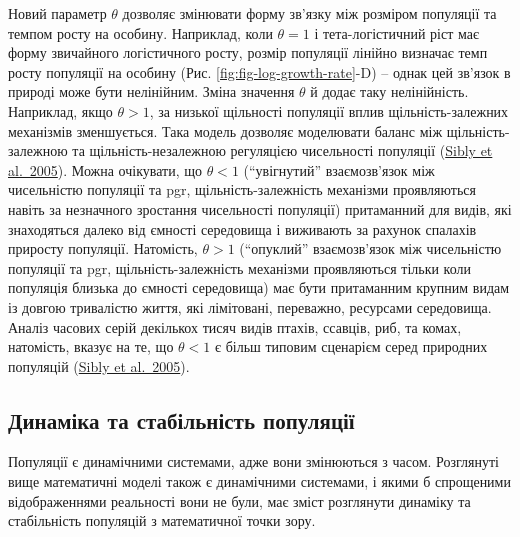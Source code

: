 \documentclass[
  11pt,
]{book}
\begin{document}
Новий параметр \(\theta\) дозволяє змінювати форму зв'язку між розміром популяції та темпом росту на особину. Наприклад, коли \(\theta = 1\) і тета-логістичний ріст має форму звичайного логістичного росту, розмір популяції лінійно визначає темп росту популяції на особину (Рис. \ref{fig:fig-log-growth-rate}-D) -- однак цей зв'язок в природі може бути нелінійним. Зміна значення \(\theta\) й додає таку нелінійність. Наприклад, якщо \(\theta > 1\), за низької щільності популяції вплив щільність-залежних механізмів зменшується. Така модель дозволяє моделювати баланс між щільність-залежною та щільність-незалежною регуляцією чисельності популяції (\href{https://doi.org/10.1126/science.1110760}{Sibly et al.~2005}). Можна очікувати, що \(\theta < 1\) (``увігнутий'' взаємозв'язок між чисельністю популяції та pgr, щільність-залежність механізми проявляються навіть за незначного зростання чисельності популяції) притаманний для видів, які знаходяться далеко від ємності середовища і виживають за рахунок спалахів приросту популяції. Натомість, \(\theta > 1\) (``опуклий'' взаємозв'язок між чисельністю популяції та pgr, щільність-залежність механізми проявляються тільки коли популяція близька до ємності середовища) має бути притаманним крупним видам із довгою тривалістю життя, які лімітовані, переважно, ресурсами середовища. Аналіз часових серій декількох тисяч видів птахів, ссавців, риб, та комах, натомість, вказує на те, що \(\theta < 1\) є більш типовим сценарієм серед природних популяцій (\href{https://doi.org/10.1126/science.1110760}{Sibly et al.~2005}).

\subsection{Динаміка та стабільність популяції}\label{ux434ux438ux43dux430ux43cux456ux43aux430-ux442ux430-ux441ux442ux430ux431ux456ux43bux44cux43dux456ux441ux442ux44c-ux43fux43eux43fux443ux43bux44fux446ux456ux457}

Популяції є динамічними системами, адже вони змінюються з часом. Розглянуті вище математичні моделі також є динамічними системами, і якими б спрощеними відображеннями реальності вони не були, має зміст розглянути динаміку та стабільність популяцій з математичної точки зору.
\end{document}
